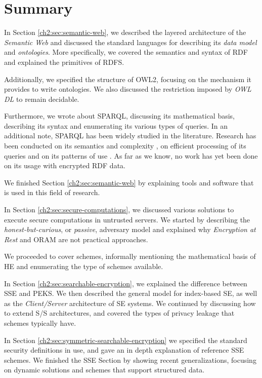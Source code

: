 \section{Summary}
\label{ch2:sec:summary}

In Section \ref{ch2:sec:semantic-web}, we described the layered architecture of the \emph{Semantic Web} and discussed the standard languages for describing its \emph{data model} and \emph{ontologies}. More specifically, we covered the semantics and syntax of \gls{RDF} and explained the primitives of \gls{RDFS}. 

Additionally, we specified the structure of \gls{OWL2}, focusing on the mechanism it provides to write ontologies. We also discussed the restriction imposed by \emph{OWL DL} to remain decidable. 

Furthermore, we wrote about \gls{SPARQL}, discussing its mathematical basis, describing its syntax and enumerating its various types of queries. In an additional note, \gls{SPARQL} has been widely studied in the literature. Research has been conducted on its semantics and complexity \autocite{Perez2009-xx}, on efficient processing of its queries \autocite{Letelier2013-rs} and on its patterns of use \autocite{Bonifati2017-hf, Picalausa2011-ca}. As far as we know, no work has yet been done on its usage with encrypted \gls{RDF} data.

We finished Section \ref{ch2:sec:semantic-web} by explaining tools and software that is used in this field of research.

In Section \ref{ch2:sec:secure-computations}, we discussed various solutions to execute secure computations in untrusted servers. We started by describing the \emph{honest-but-curious}, or \emph{passive}, adversary model and explained why \emph{Encryption at Rest} and \gls{ORAM} are not practical approaches. 

We proceeded to cover  schemes, informally mentioning the mathematical basis of \gls{HE} and enumerating the type of schemes available.

In Section \ref{ch2:sec:searchable-encryption}, we explained the difference between \gls{SSE} and \gls{PEKS}. We then described the general model for index-based \gls{SE}, as well as the \emph{Client/Server} architecture of \gls{SE} systems. We continued by discussing how to extend \gls{S/S} architectures, and covered the types of privacy leakage that schemes typically have.

In Section \ref{ch2:sec:symmetric-searchable-encryption} we specified the standard security definitions in use, and gave an in depth explanation of reference \gls{SSE} schemes. We finished the \gls{SSE} Section by showing recent generalizations, focusing on dynamic solutions and schemes that support structured data.

